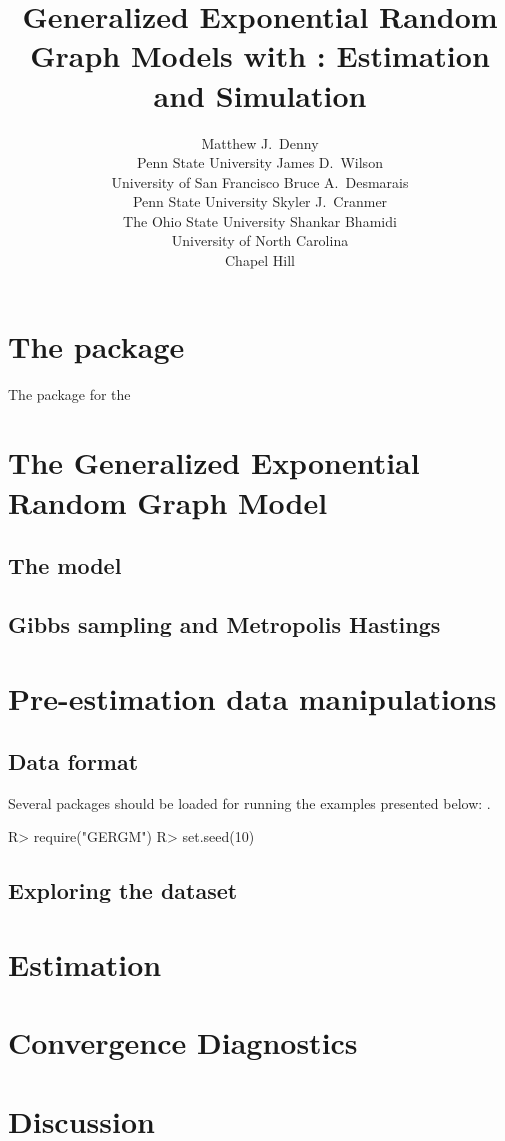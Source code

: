 \documentclass[article]{jss}
\author{Matthew J.\ Denny\\Penn State University \And 
		James D.\ Wilson\\University of San Francisco \And 
		Bruce A.\ Desmarais\\Penn State University \And
        Skyler J.\ Cranmer\\The Ohio State University \And
        Shankar Bhamidi\\University of North Carolina\\Chapel Hill}
\title{Generalized Exponential Random Graph Models with \pkg{GERGM}: Estimation and Simulation}
\begin{document}

\section[The GERGM package]{The  package}

The  package for the 


\section{The Generalized Exponential Random Graph Model}


\subsection{The model}

\subsection{Gibbs sampling and Metropolis Hastings}

\section{Pre-estimation data manipulations} \label{dataprep}



\subsection{Data format}
Several  packages should be loaded for running the examples presented below: .

\begin{Schunk}
\begin{Sinput}
R> require("GERGM")
R> set.seed(10)
\end{Sinput}
\end{Schunk}

\subsection{Exploring the dataset}

\section{Estimation}\label{sect:estimation}


\section{Convergence Diagnostics}\label{sect:other}


\section{Discussion}


\end{document}

